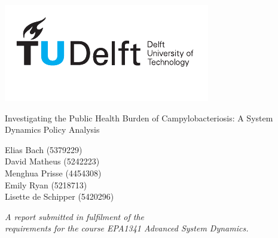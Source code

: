 \documentclass[a4paper,11, oneside]{article}
\begin{document}
	\begin{center}
		\includegraphics[width=\textwidth]{logo.pdf}
	\end{center}
	
	\begin{center}
		
		\Huge Investigating the Public Health Burden of Campylobacteriosis: A System Dynamics Policy Analysis\\		
        
        
    
		
		
	\end{center}
	\vspace{2.5cm}
	\begin{center}
		\Large Elias Bach (5379229) \\  David Matheus (5242223) \\ Menghua Prisse (4454308) \\ Emily Ryan (5218713) \\ Lisette de Schipper (5420296)
	\end{center}
	\vspace*{-2.5cm}
	
	\vspace{6cm}
	\begin{center}
		{\large \textit{A report submitted in fulfilment of the \\requirements for the course EPA1341 Advanced System Dynamics.}}
	\end{center}
	
\end{document}
